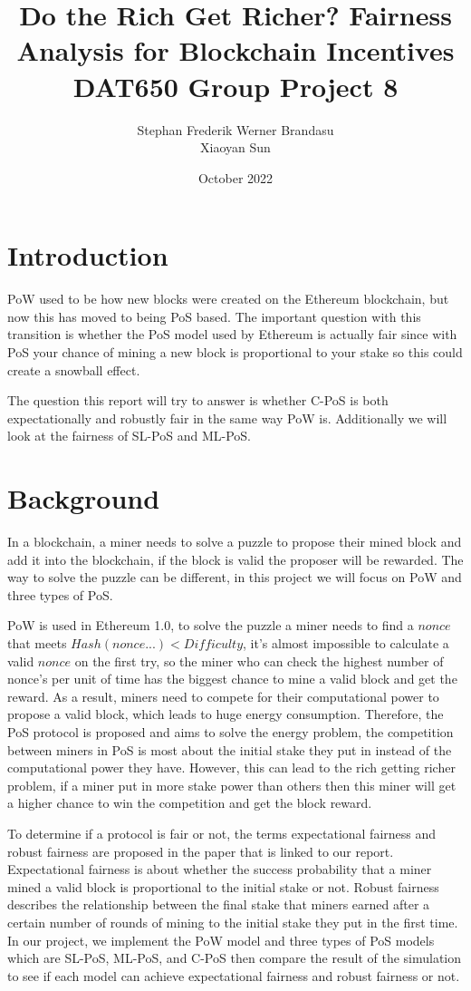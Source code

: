 \documentclass{article}
\title{Do the Rich Get Richer? Fairness Analysis for Blockchain Incentives \\
\large{DAT650 Group Project 8}}
\author{Stephan Frederik Werner Brandasu \\
Xiaoyan Sun}
\date{October 2022}
\begin{document}
\maketitle

\section{Introduction}
\gls{PoW} used to be how new blocks were created on the Ethereum blockchain, but now this has moved to being \gls{PoS} based. The important question with this transition is whether the \gls{PoS} model used by Ethereum is actually fair since with \gls{PoS} your chance of mining a new block is proportional to your stake so this could create a snowball effect. 

The question this report will try to answer is whether \gls{C-PoS} is both expectationally and robustly fair in the same way \gls{PoW} is. Additionally we will look at the fairness of \gls{SL-PoS} and \gls{ML-PoS}.

\section{Background}
In a blockchain, a miner needs to solve a puzzle to propose their mined block and add it into the blockchain, if the block is valid the proposer will be rewarded. The way to solve the puzzle can be different, in this project we will focus on \gls{PoW} and three types of \gls{PoS}.

\gls{PoW} is used in Ethereum 1.0, to solve the puzzle a miner needs to find a $nonce$ that meets $Hash(nonce...)<Difficulty$, it's almost impossible to calculate a valid $nonce$ on the first try, so the miner who can check the highest number of nonce's per unit of time has the biggest chance to mine a valid block and get the reward. As a result, miners need to compete for their computational power to propose a valid block, which leads to huge energy consumption. Therefore, the \gls{PoS} protocol is proposed and aims to solve the energy problem, the competition between miners in \gls{PoS} is most about the initial stake they put in instead of the computational power they have. However, this can lead to the rich getting richer problem, if a miner put in more stake power than others then this miner will get a higher chance to win the competition and get the block reward. 

To determine if a protocol is fair or not, the terms expectational fairness and robust fairness are proposed in the paper\cite{paper} that is linked to our report. Expectational fairness is about whether the success probability that a miner mined a valid block is proportional to the initial stake or not. Robust fairness describes the relationship between the final stake that miners earned after a certain number of rounds of mining to the initial stake they put in the first time. In our project, we implement the \gls{PoW} model and three types of \gls{PoS} models which are \gls{SL-PoS}, \gls{ML-PoS}, and \gls{C-PoS} then compare the result of the simulation to see if each model can achieve expectational fairness and robust fairness or not.
\end{document}
